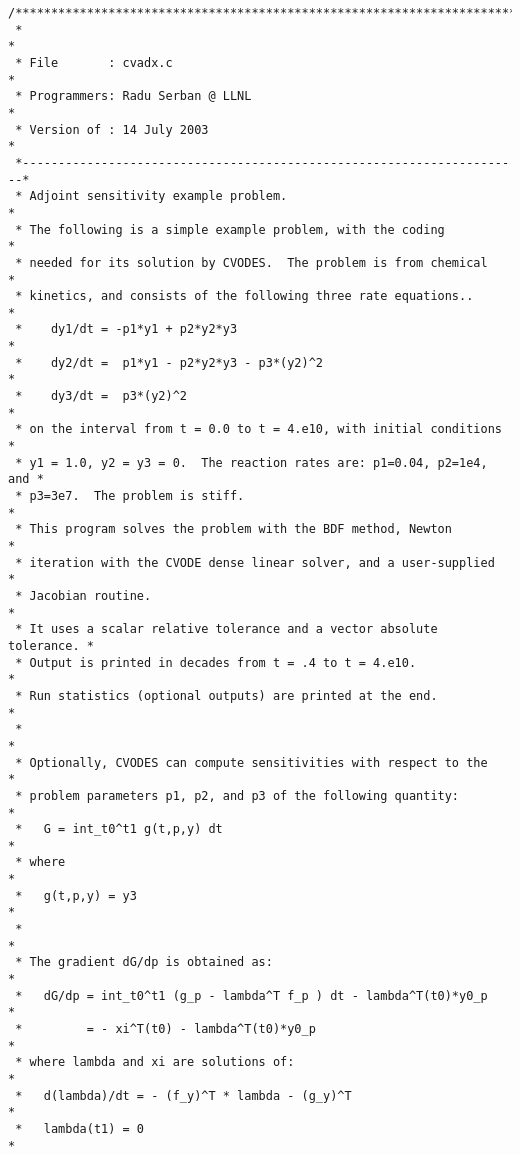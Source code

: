 \begin{verbatim}
/************************************************************************
 *                                                                      *
 * File       : cvadx.c                                                 *
 * Programmers: Radu Serban @ LLNL                                      *
 * Version of : 14 July 2003                                            *
 *----------------------------------------------------------------------*
 * Adjoint sensitivity example problem.                                 *
 * The following is a simple example problem, with the coding           *
 * needed for its solution by CVODES.  The problem is from chemical     *
 * kinetics, and consists of the following three rate equations..       *
 *    dy1/dt = -p1*y1 + p2*y2*y3                                        *
 *    dy2/dt =  p1*y1 - p2*y2*y3 - p3*(y2)^2                            *
 *    dy3/dt =  p3*(y2)^2                                               *
 * on the interval from t = 0.0 to t = 4.e10, with initial conditions   *
 * y1 = 1.0, y2 = y3 = 0.  The reaction rates are: p1=0.04, p2=1e4, and *
 * p3=3e7.  The problem is stiff.                                       *
 * This program solves the problem with the BDF method, Newton          *
 * iteration with the CVODE dense linear solver, and a user-supplied    *
 * Jacobian routine.                                                    * 
 * It uses a scalar relative tolerance and a vector absolute tolerance. *
 * Output is printed in decades from t = .4 to t = 4.e10.               *
 * Run statistics (optional outputs) are printed at the end.            *
 *                                                                      *
 * Optionally, CVODES can compute sensitivities with respect to the     *
 * problem parameters p1, p2, and p3 of the following quantity:         *
 *   G = int_t0^t1 g(t,p,y) dt                                          *
 * where                                                                *
 *   g(t,p,y) = y3                                                      *
 *                                                                      *
 * The gradient dG/dp is obtained as:                                   *
 *   dG/dp = int_t0^t1 (g_p - lambda^T f_p ) dt - lambda^T(t0)*y0_p     *
 *         = - xi^T(t0) - lambda^T(t0)*y0_p                             *
 * where lambda and xi are solutions of:                                *
 *   d(lambda)/dt = - (f_y)^T * lambda - (g_y)^T                        *
 *   lambda(t1) = 0                                                     *

\end{verbatim}
